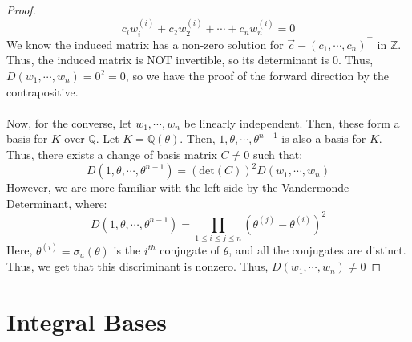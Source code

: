 \documentclass{article}
\newcommand{\Q}{\mathbb{Q}}
\newcommand{\Z}{\mathbb{Z}}
\begin{document}
\begin{proof}
$$c_iw_i^{(i)}+c_2w_2^{(i)}+\cdots +c_nw_n^{(i)}=0$$
We know the induced matrix has a non-zero solution for $\vec{c}-(c_1,\cdots ,c_n)^\top$ in $\Z$. Thus, the induced matrix is NOT invertible, so its determinant is 0. Thus, $D(w_1,\cdots ,w_n)=0^2=0$, so we have the proof of the forward direction by the contrapositive.\\
\\
Now, for the converse, let $w_1,\cdots ,w_n$ be linearly independent. Then, these form a basis for $K$ over $\Q$. Let $K=\Q(\theta)$. Then, $1,\theta,\cdots, \theta^{n-1}$ is also a basis for $K$. Thus, there exists a change of basis matrix $C\neq 0$ such that:
$$D(1,\theta,\cdots, \theta^{n-1})=(\text{det}(C))^2D(w_1,\cdots, w_n)$$
However, we are more familiar with the left side by the Vandermonde Determinant, where:
$$D(1,\theta,\cdots, \theta^{n-1})=\displaystyle\prod_{1\leq i\leq j\leq n}(\theta^{(j)}-\theta^{(i)})^2$$
Here, $\theta^{(i)}=\sigma_u(\theta)$ is the $i^{th}$ conjugate of $\theta$, and all the conjugates are distinct. Thus, we get that this discriminant is nonzero. Thus, $D(w_1,\cdots, w_n)\neq 0$
\end{proof}
\newpage
\section{Integral Bases}
\end{document}
